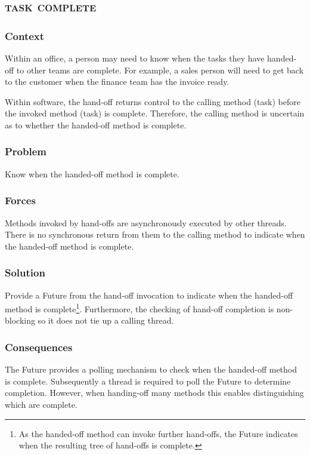 \documentclass[prodmode]{style/acmlarge}
\begin{document}
\subsection{\textsc{\textbf{task complete}}}

\subsubsection*{Context} Within an office, a person may need to know when the
tasks they have handed-off to other teams are complete.  For example, a sales
person will need to get back to the customer when the finance team has the
invoice ready.

Within software, the hand-off returns control to the calling method (task)
before the invoked method (task) is complete.  Therefore, the calling method is
uncertain as to whether the handed-off method is complete.

\subsubsection*{\textbf{Problem}} Know when the handed-off method is complete.

\subsubsection*{Forces} Methods invoked by hand-offs are asynchronously executed
by other threads.  There is no synchronous return from them to the calling
method to indicate when the handed-off method is complete.

\subsubsection*{\textbf{Solution}} Provide a Future from the hand-off invocation to
indicate when the handed-off method is complete\footnote{As the handed-off
method can invoke further hand-offs, the Future indicates when the resulting
tree of hand-offs is complete.}.  Furthermore, the checking of hand-off
completion is non-blocking so it does not tie up a calling thread.

\subsubsection*{Consequences} The Future provides a polling mechanism to check
when the handed-off method is complete.  Subsequently a thread is required to
poll the Future to determine completion.  However, when handing-off many methods
this enables distinguishing which are complete.
\end{document}
